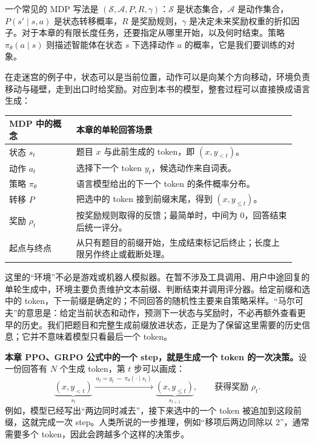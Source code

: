 一个常见的 MDP 写法是 $(\mathcal S,\mathcal A,P,R,\gamma)$：$\mathcal S$ 是状态集合，$\mathcal A$ 是动作集合，$P(s'\mid s,a)$ 是状态转移概率，$R$ 是奖励规则，$\gamma$ 是决定未来奖励权重的折扣因子。对于本章的有限长度任务，还要指定从哪里开始，以及何时结束。策略 $\pi_\theta(a\mid s)$ 则描述智能体在状态 $s$ 下选择动作 $a$ 的概率，它是我们要训练的对象。

在走迷宫的例子中，状态可以是当前位置，动作可以是向某个方向移动，环境负责移动与碰壁，走到出口时给奖励。对应到本书的模型，整套过程可以直接换成语言生成：

\begin{center}
\begin{tabular}{@{}p{0.22\linewidth}p{0.72\linewidth}@{}}
\toprule
MDP 中的概念 & 本章的单轮回答场景 \\
\midrule
状态 $s_t$ & 题目 $x$ 与此前生成的 token，即 $(x,y_{<t})$。 \\
动作 $a_t$ & 选择下一个 token $y_t$，候选动作来自词表。 \\
策略 $\pi_\theta$ & 语言模型给出的下一个 token 的条件概率分布。 \\
转移 $P$ & 把选中的 token 接到前缀末尾，得到 $(x,y_{\leq t})$。 \\
奖励 $\rho_t$ & 按奖励规则取得的反馈；最简单时，中间为 0，回答结束后统一评分。 \\
起点与终点 & 从只有题目的前缀开始，生成结束标记后终止；长度上限另作终止或截断处理。 \\
\bottomrule
\end{tabular}
\end{center}

这里的``环境''不必是游戏或机器人模拟器。在暂不涉及工具调用、用户中途回复的单轮生成中，环境主要负责维护文本前缀、判断结束并调用评分器。给定前缀和选中的 token，下一前缀是确定的；不同回答的随机性主要来自策略采样。``马尔可夫''的意思是：给定当前状态和动作，预测下一状态与奖励时，不必再额外查看更早的历史。我们把题目和完整生成前缀放进状态，正是为了保留这里需要的历史信息；它并不意味着模型只看最后一个 token。

\textbf{本章 PPO、GRPO 公式中的一个 step，就是生成一个 token 的一次决策。}设一份回答有 $N$ 个生成 token，第 $t$ 步可以画成：
\[
    \underbrace{(x,y_{<t})}_{s_t}
    \xrightarrow{\ a_t=y_t\ \sim\ \pi_\theta(\cdot\mid s_t)\ }
    \underbrace{(x,y_{\leq t})}_{s_{t+1}},
    \qquad \text{获得奖励 }\rho_t.
\]
例如，模型已经写出``两边同时减去''，接下来选中的一个 token 被追加到这段前缀，这就完成一次 step。人类所说的一步推理，例如``移项后两边同除以 2''，通常需要多个 token，因此会跨越多个这样的决策步。

